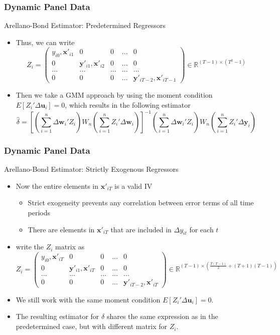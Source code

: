 \documentclass{beamer}
\begin{document}
\begin{frame}
\frametitle{Dynamic Panel Data}
Arellano-Bond Estimator: Predetermined Regressors
\begin{itemize}
\item Thus, we can write
\[
Z_i = \begin{pmatrix}y_{i0}, \mathbf{x}'_{i1}& 0 &0 &...& 0\\ 0 & \mathbf{y}'_{i1},\mathbf{x}'_{i2} & 0 & ... & 0 \\ ...&...&...&...&...\\ 0 & 0& 0& ... & \mathbf{y}'_{iT-2},\mathbf{x}'_{iT-1}\end{pmatrix}\in\mathbb{R}^{(T-1)\times (T^2-1)}
\]
\item  Then we take a GMM approach by using the moment condition $E[Z_i'\Delta\mathbf{u}_i]=0$, which results in the following estimator
\small{\[
\hat{\delta}=\left[\left(\sum_{i=1}^n\Delta \mathbf{w}_{i}' Z_i\right)W_n\left(\sum_{i=1}^n Z_i' \Delta \mathbf{w}_{i}\right) \right]^{-1}\left(\sum_{i=1}^n\Delta \mathbf{w}_{i}' Z_i\right)W_n\left(\sum_{i=1}^n Z_i' \Delta \mathbf{y}_i \right)
\]}\normalsize
\end{itemize}
\end{frame}

\begin{frame}
\frametitle{Dynamic Panel Data}
Arellano-Bond Estimator: Strictly Exogenous Regressors
\begin{itemize}
\item Now  the entire elements in $\mathbf{x}'_{iT}$ is a valid IV
\begin{itemize}
\item Strict exogeneity prevents any correlation between error terms of all time periods
\item There are elements in $\mathbf{x}'_{iT}$ that are included in $\Delta y_{it}$ for each $t$
\end{itemize}
\item write the $Z_i$ matrix as
\small{\[
Z_i = \begin{pmatrix}y_{i0}, \mathbf{x}'_{iT}& 0 &0 &...& 0\\ 0 & \mathbf{y}'_{i1},\mathbf{x}'_{iT}& 0 & ... & 0 \\ ...&...&...&...&...\\ 0 & 0& 0& ... & \mathbf{y}'_{iT-2},\mathbf{x}'_{iT}\end{pmatrix}\in\mathbb{R}^{(T-1)\times \left(\frac{T(T-1)}{2}+(T+1)(T-1)\right)}
\]}\normalsize
\item We still work with the same moment condition $E[Z_i'\Delta \mathbf{u}_i]=0$. 
\item The resulting estimator for $\delta$ shares the same expression as in the predetermined case, but with different matrix for $Z_i$. 
\end{itemize}
\end{frame}
\end{document}
